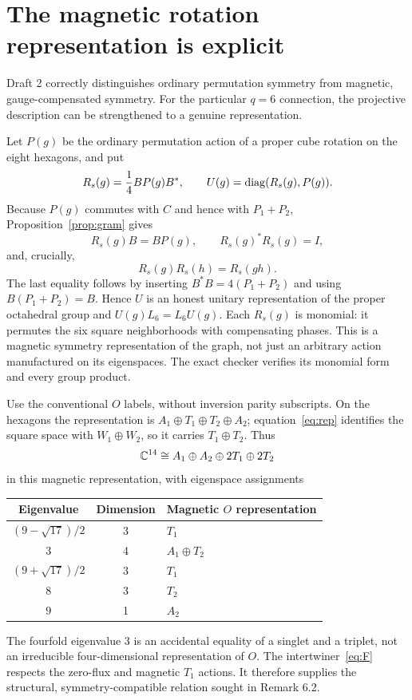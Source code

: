 \documentclass[11pt,a4paper]{article}
\begin{document}
\section{The magnetic rotation representation is explicit}
Draft 2 correctly distinguishes ordinary permutation symmetry from magnetic, gauge-compensated symmetry. For the particular $q=6$ connection, the projective description can be strengthened to a genuine representation.

Let $P(g)$ be the ordinary permutation action of a proper cube rotation on the eight hexagons, and put
\begin{equation}\label{eq:rep}
 R_s(g)=\frac14BP(g)B^*,\qquad
 U(g)=\operatorname{diag}(R_s(g),P(g)).
\end{equation}
Because $P(g)$ commutes with $C$ and hence with $P_1+P_2$, Proposition~\ref{prop:gram} gives
\[
 R_s(g)B=BP(g),\qquad R_s(g)^*R_s(g)=I,
\]
and, crucially,
\[
 R_s(g)R_s(h)=R_s(gh).
\]
The last equality follows by inserting $B^*B=4(P_1+P_2)$ and using $B(P_1+P_2)=B$. Hence $U$ is an honest unitary representation of the proper octahedral group and $U(g)L_6=L_6U(g)$. Each $R_s(g)$ is monomial: it permutes the six square neighborhoods with compensating phases. This is a magnetic symmetry representation of the graph, not just an arbitrary action manufactured on its eigenspaces. The exact checker verifies its monomial form and every group product.

Use the conventional $O$ labels, without inversion parity subscripts. On the hexagons the representation is $A_1\oplus T_1\oplus T_2\oplus A_2$; equation~\eqref{eq:rep} identifies the square space with $W_1\oplus W_2$, so it carries $T_1\oplus T_2$. Thus
\begin{equation}
 \mathbb C^{14}\cong A_1\oplus A_2\oplus2T_1\oplus2T_2
\end{equation}
in this magnetic representation, with eigenspace assignments
\begin{center}
\begin{tabular}{ccl}
\toprule
Eigenvalue & Dimension & Magnetic $O$ representation\\\midrule
$(9-\sqrt{17})/2$ & 3 & $T_1$\\
$3$ & 4 & $A_1\oplus T_2$\\
$(9+\sqrt{17})/2$ & 3 & $T_1$\\
$8$ & 3 & $T_2$\\
$9$ & 1 & $A_2$\\\bottomrule
\end{tabular}
\end{center}
The fourfold eigenvalue $3$ is an accidental equality of a singlet and a triplet, not an irreducible four-dimensional representation of $O$. The intertwiner~\eqref{eq:F} respects the zero-flux and magnetic $T_1$ actions. It therefore supplies the structural, symmetry-compatible relation sought in Remark 6.2.
\end{document}
